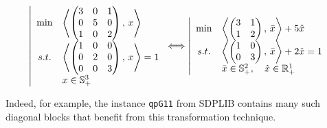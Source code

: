 \begin{example}
\begin{equation*}
    \left|
    \begin{array}{cl}
        \min & \left\langle \begin{pmatrix}
            3 & 0 & 1 \\
            0 & 5 & 0 \\
            1 & 0 & 2
        \end{pmatrix}, \, x \right\rangle \\
        s.t. 
        & \left\langle \begin{pmatrix}
            1 & 0 & 0 \\ 
            0 & 2 & 0 \\ 
            0 & 0 & 3
        \end{pmatrix}, \, x \right\rangle = 1 \\
        & x\in \mathbb{S}^3_+ 
    \end{array}
    \right.
    \Longleftrightarrow
    \left|
    \begin{array}{cl}
        \min & \left\langle \begin{pmatrix}
            3 & 1 \\
            1 & 2
        \end{pmatrix}, \, \bar{x} \right\rangle + 5\hat{x} \\
        s.t. 
        & \left\langle \begin{pmatrix}
            1 & 0 \\ 0 & 3
        \end{pmatrix}, \, \bar{x} \right\rangle + 2\hat{x} = 1 \\
        & \bar{x}\in \mathbb{S}^2_+, \quad \hat{x} \in \mathbb{R}^1_+
    \end{array}
    \right.
\end{equation*}
\end{example}
Indeed, for example, the instance \texttt{qpG11} from SDPLIB contains many such diagonal blocks that benefit from this transformation technique.


